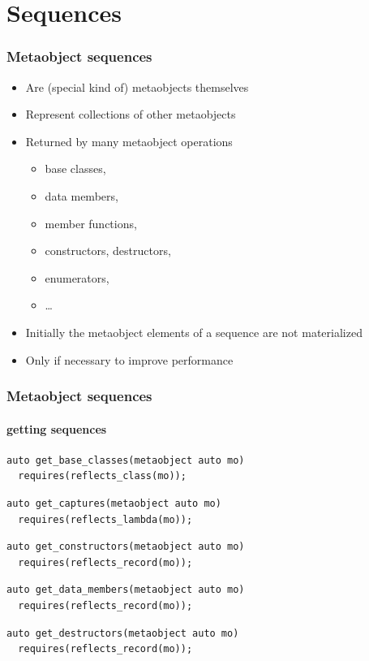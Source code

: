 \documentclass[compress,table,xcolor=table]{beamer}
\begin{document}
\section{Sequences}
\begin{frame}
  \frametitle{Metaobject sequences}
  \larger
  \begin{itemize}
    \item Are (special kind of) metaobjects themselves
    \item Represent collections of other metaobjects
    \item Returned by many metaobject operations
    \begin{itemize}
      \smaller
      \item base classes,
      \item data members,
      \item member functions,
      \item constructors, destructors,
      \item enumerators,
      \item \ldots
    \end{itemize}
    \item Initially the metaobject elements of a sequence are not materialized
    \item Only  if necessary to improve performance
  \end{itemize}
\end{frame}
\begin{frame}[fragile]
  \frametitle{Metaobject sequences}
  \framesubtitle{getting sequences}
  \begin{lstlisting}[language=c++2x,basicstyle=\small\ttfamily]
auto get_base_classes(metaobject auto mo)
  requires(reflects_class(mo));
  \end{lstlisting}
  \vfill
  \begin{lstlisting}[language=c++2x,basicstyle=\small\ttfamily]
auto get_captures(metaobject auto mo)
  requires(reflects_lambda(mo));
  \end{lstlisting}
  \vfill
  \begin{lstlisting}[language=c++2x,basicstyle=\small\ttfamily]
auto get_constructors(metaobject auto mo)
  requires(reflects_record(mo));
  \end{lstlisting}
  \vfill
  \begin{lstlisting}[language=c++2x,basicstyle=\small\ttfamily]
auto get_data_members(metaobject auto mo)
  requires(reflects_record(mo));
  \end{lstlisting}
  \vfill
  \begin{lstlisting}[language=c++2x,basicstyle=\small\ttfamily]
auto get_destructors(metaobject auto mo)
  requires(reflects_record(mo));
  \end{lstlisting}
\end{frame}
\end{document}
